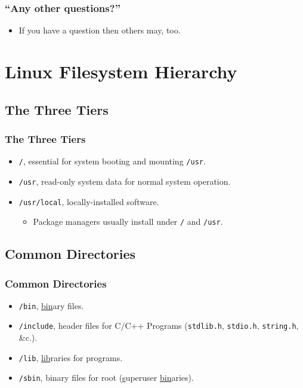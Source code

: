 \documentclass[xcolor={dvipsnames,svgnames},hyperref=dvips]{beamer}
\begin{document}
	\begin{frame}
		\frametitle{``Any other questions?''}
		\begin{itemize}
		\item If you have a question then others may, too.
		\end{itemize}
	\end{frame}

\section{Linux Filesystem Hierarchy}\label{section:lfsh}
	\subsection{The Three Tiers}
	\begin{frame}
		\frametitle{The Three Tiers}
		\begin{itemize}
		\item \texttt{/}, essential for system booting and mounting \texttt{/usr}.
		\item \texttt{/usr}, read-only system data for normal system operation.
		\item \texttt{/usr/local}, locally-installed software.
			\begin{itemize}
			\item Package managers usually install under \texttt{/} and \texttt{/usr}.
			\end{itemize}
		\end{itemize}
	\end{frame}

	\subsection{Common Directories}
	\begin{frame}
		\frametitle{Common Directories}
		\begin{itemize}
		\item \texttt{/bin}, \underline{bin}ary files.
		\item \texttt{/include}, header files for C/C++ Programs (\texttt{stdlib.h}, \texttt{stdio.h}, \texttt{string.h}, \&c.).
		\item \texttt{/lib}, \underline{lib}raries for programs.
		\item \texttt{/sbin}, binary files for root (\underline{s}uperuser \underline{bin}aries).
		\end{itemize}
	\end{frame}
\end{document}
